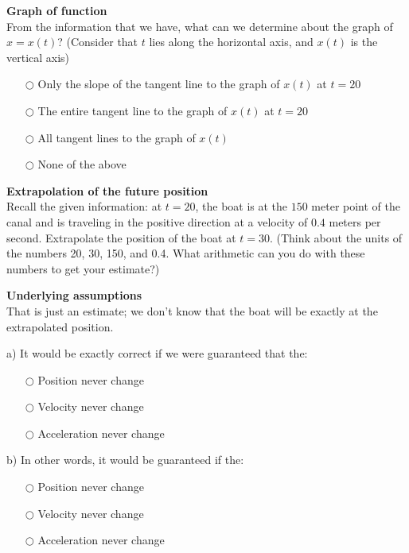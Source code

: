 \documentclass[pdftex, brazil, 12pt, twoside]{article}
\begin{document}
\begin{exercise}
  \textbf{Graph of function}\\%
  From the information that we have, what can we determine about the graph of
  $x = x(t)$? (Consider that $t$ lies along the horizontal axis, and $x(t)$
  is the vertical axis)
  \begin{itemize}[noitemsep]
  \item[$\bigcirc$] Only the slope of the tangent line to the graph of $x(t)$ at $t=20$
  \item[$\bigcirc$] The entire tangent line to the graph of $x(t)$ at $t=20$
  \item[$\bigcirc$] All tangent lines to the graph of $x(t)$
  \item[$\bigcirc$] None of the above
  \end{itemize}
\end{exercise}

\begin{exercise}
  \textbf{Extrapolation of the future position}\\%
  Recall the given information: at $t=20$, the boat is at the $150$ meter point of
  the canal and is traveling in the positive direction at a velocity of $0.4$ meters
  per second. Extrapolate the position of the boat at $t=30$. (Think about the units
  of the numbers 20, 30, 150, and 0.4. What arithmetic can you do with these numbers
  to get your estimate?)
\end{exercise}

\begin{exercise}
  \textbf{Underlying assumptions}\\%
  That is just an estimate; we don't know that the boat will be exactly at the
  extrapolated position.

  a) It would be exactly correct if we were guaranteed that the:
  \begin{itemize}[noitemsep]
  \item[$\bigcirc$] Position never change
  \item[$\bigcirc$] Velocity never change
  \item[$\bigcirc$] Acceleration never change
  \end{itemize}

  b) In other words, it would be guaranteed if the:
  \begin{itemize}[noitemsep]
  \item[$\bigcirc$] Position never change
  \item[$\bigcirc$] Velocity never change
  \item[$\bigcirc$] Acceleration never change
  \end{itemize}
\end{exercise}
\end{document}
